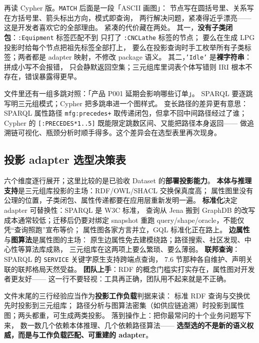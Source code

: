 再读 Cypher 版。\texttt{MATCH} 后面是一段「ASCII 画图」：
节点写在圆括号里、关系写在方括号里、箭头标出方向，模式即查询，
两行解决问题，紧凑得近乎漂亮——这是开发者喜欢它的全部理由。
紧凑的代价藏在两处。
其一，\textbf{没有子类闭包}：\texttt{:Equipment} 标签匹配不到
只打了 \texttt{:CNCLathe} 标签的节点；
要么在生成 LPG 投影时给每个节点把祖先标签全部打上，
要么在投影查询时手工枚举所有子类标签；两者都是 adapter 映射，不修改 package 语义。
其二，\texttt{'Idle'} 是\textbf{裸字符串}：拼成小写不会报错，
只会静默返回空集；三元组库里词表个体写错则 IRI 根本不存在，错误暴露得更早。

文件里还有一组多跳对照：「产品 P001 延期会影响哪些订单」。
SPARQL 要逐跳写明三元组模式；Cypher 把多跳串进一个图样式。
变长路径的差异更有意思：SPARQL 属性路径 \texttt{mfg:precedes+}
取传递闭包，但拿不回中间路径经过了谁；
Cypher 的 \texttt{[:PRECEDES*1..5]} 既能限定跳数区间、又能把路径本身返回——
做追溯链可视化、瓶颈分析时顺手得多。这个差异会在选型表里再次现身。

\subsection{投影 adapter 选型决策表}



六个维度逐行展开；这里比较的是已验收 Dataset 的\textbf{部署投影能力}。
\textbf{本体与推理支持}是三元组库投影的主场：RDF/OWL/SHACL 交换保真度高；
属性图里没有公理的位置，子类闭包、属性传递都要在应用层重新发明一遍。
\textbf{标准化}决定 adapter 可替换性：SPARQL 是 W3C 标准，
查询从 Jena 搬到 GraphDB 的改写成本通常较低；迁移后仍要对绑定 snapshot 重跑
query/shape/oracle，不能仅凭“查询照跑”宣布等价；
属性图各家方言并立，GQL 标准化正在路上。
\textbf{边属性}与\textbf{图算法}是属性图的主场：
原生边属性免去建模绕路；路径搜索、社区发现、中心性等算法库成熟，
三元组库在这两项上要么繁琐、要么薄弱。
\textbf{联邦查询}：SPARQL 的 \texttt{SERVICE} 关键字原生支持跨端点查询，
7.6 节那种各自维护、声明关联的联邦格局天然受益。
\textbf{团队上手}：RDF 的概念门槛实打实存在，属性图对开发者更友好——
这一行不要轻视：工具再正确，团队用不起来就是不正确。

文件末尾的三行经验应当作为\textbf{投影工作负载}判据来读：
标准 RDF 查询与交换优先时投影到三元组库；
路径分析与图算法密集（如供应链追溯）时投影到属性图；两头都重，可生成两类投影。
落到操作上：把你最常问的十个业务问题写下来，
数一数几个依赖本体推理、几个依赖路径算法——
\textbf{选型选的不是新的语义权威，而是与工作负载匹配、可重建的 adapter}。

